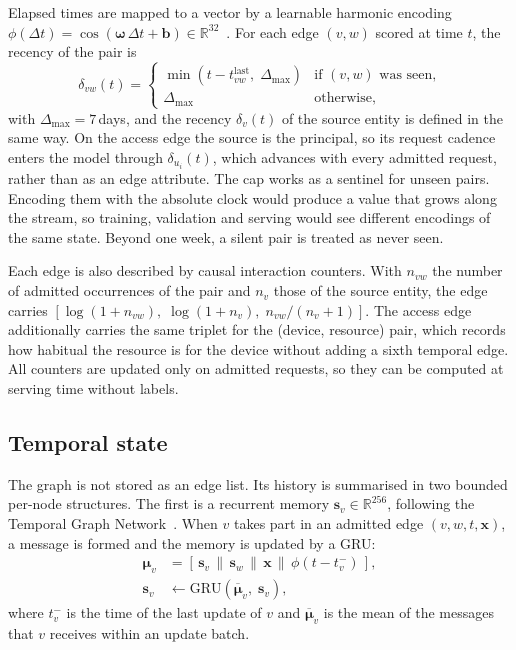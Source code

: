 Elapsed times are mapped to a vector by a learnable harmonic encoding
$\phi(\Delta t) = \cos(\boldsymbol{\omega}\,\Delta t + \mathbf{b}) \in
\mathbb{R}^{32}$~\cite{tgat,tgn}. For each edge $(v, w)$ scored at time $t$, the recency
of the pair is
\begin{equation}
  \delta_{vw}(t) =
  \begin{cases}
    \min\!\left(t - t^{\mathrm{last}}_{vw},\; \Delta_{\max}\right) & \text{if } (v,w) \text{ was seen,}\\
    \Delta_{\max} & \text{otherwise,}
  \end{cases}
  \label{eq:tgr-recency}
\end{equation}
with $\Delta_{\max} = 7$\,days, and the recency $\delta_v(t)$ of the source entity is
defined in the same way. On the access edge the source is the principal, so its request
cadence enters the model through $\delta_{u_i}(t)$, which advances with every admitted
request, rather than as an edge attribute. The cap works as a sentinel for unseen pairs.
Encoding them with the absolute clock would produce a value that grows along the stream,
so training, validation and serving would see different encodings of the same state.
Beyond one week, a silent pair is treated as never seen.

Each edge is also described by causal interaction counters. With $n_{vw}$ the number of
admitted occurrences of the pair and $n_v$ those of the source entity, the edge carries
$\left[\log(1 + n_{vw}),\; \log(1 + n_v),\; n_{vw} / (n_v + 1)\right]$. The access edge
additionally carries the same triplet for the (device, resource) pair, which records how
habitual the resource is for the device without adding a sixth temporal edge. All counters
are updated only on admitted requests, so they can be computed at serving time without
labels.

\subsection{Temporal state}
\label{sec:tgr-state}

The graph is not stored as an edge list. Its history is summarised in two bounded
per-node structures. The first is a recurrent memory
$\mathbf{s}_v \in \mathbb{R}^{256}$, following the Temporal Graph
Network~\cite{tgn}. When $v$ takes part in an admitted edge $(v, w, t, \mathbf{x})$, a
message is formed and the memory is updated by a GRU:
\begin{equation}
  \begin{aligned}
    \boldsymbol{\mu}_v &= \left[\,\mathbf{s}_v \,\|\, \mathbf{s}_w \,\|\, \mathbf{x}
                          \,\|\, \phi(t - t_v^{-})\,\right],\\
    \mathbf{s}_v &\leftarrow \mathrm{GRU}\!\left(\overline{\boldsymbol{\mu}}_v,\; \mathbf{s}_v\right),
  \end{aligned}
  \label{eq:tgr-memory}
\end{equation}
where $t_v^{-}$ is the time of the last update of $v$ and $\overline{\boldsymbol{\mu}}_v$
is the mean of the messages that $v$ receives within an update batch.

